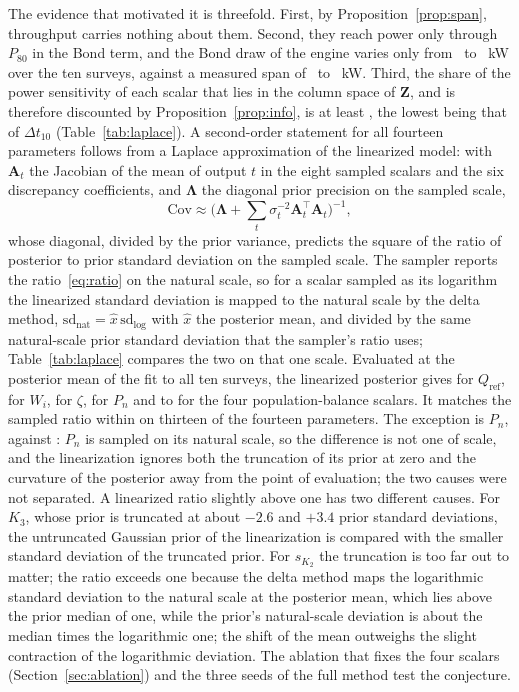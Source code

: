 \documentclass[journal]{IEEEtran}
\begin{document}
The evidence that motivated it is threefold. First, by Proposition~\ref{prop:span}, throughput carries nothing about
them. Second, they reach power only through $P_{80}$ in the Bond term, and the Bond draw of the engine varies only from
\bondKwMin\ to \bondKwMax~kW over the ten surveys, against a measured span of \kwMMin\ to \kwMMax~kW. Third, the share of
the power sensitivity of each scalar that lies in the column space of $\mathbf Z$, and is therefore discounted by
Proposition~\ref{prop:info}, is at least \thSpanMin{}, the lowest being that of $\Delta t_{10}$ (Table~\ref{tab:laplace}). A
second-order statement for all fourteen parameters follows from a Laplace approximation of the linearized model: with
$\mathbf A_t$ the Jacobian of the mean of output $t$ in the eight sampled scalars and the six discrepancy coefficients, and
$\boldsymbol\Lambda$ the diagonal prior precision on the sampled scale,
\begin{equation}
\mathrm{Cov}\approx\Big(\boldsymbol\Lambda+\sum_t\sigma_t^{-2}\mathbf A_t^{\top}\mathbf A_t\Big)^{-1},
\label{eq:laplace}
\end{equation}
whose diagonal, divided by the prior variance, predicts the square of the ratio of posterior to prior standard deviation
on the sampled scale. The sampler reports the ratio~\eqref{eq:ratio} on the natural scale, so for a scalar sampled as its
logarithm the linearized standard deviation is mapped to the natural scale by the delta method,
$\mathrm{sd}_{\mathrm{nat}}=\hat x\,\mathrm{sd}_{\log}$ with $\hat x$ the posterior mean, and divided by the same
natural-scale prior standard deviation that the sampler's ratio uses; Table~\ref{tab:laplace} compares the two on that one
scale. Evaluated at the posterior mean of the fit to all ten surveys, the linearized posterior gives \thLapQRef{} for
$Q_{\mathrm{ref}}$, \thLapWi{} for $W_i$, \thLapZeta{} for $\zeta$, \thLapPn{} for $P_n$ and \thLapPbMin{} to
\thLapPbMax{} for the four population-balance scalars. It matches the sampled ratio within \thLapMaxDevRest{} on thirteen
of the fourteen parameters. The exception is $P_n$, \thLapPn{} against \pnContr: $P_n$ is sampled on its natural scale, so
the difference is not one of scale, and the linearization ignores both the truncation of its prior at zero and the
curvature of the posterior away from the point of evaluation; the two causes were not separated. A linearized ratio
slightly above one has two different causes. For $K_3$, whose prior is truncated at about $-2.6$ and $+3.4$ prior standard
deviations, the untruncated Gaussian prior of the linearization is compared with the smaller standard deviation of the
truncated prior. For $s_{K_2}$ the truncation is too far out to matter; the ratio exceeds one because the delta method maps
the logarithmic standard deviation to the natural scale at the posterior mean, which lies above the prior median of one,
while the prior's natural-scale deviation is about the median times the logarithmic one; the shift of the mean outweighs the
slight contraction of the logarithmic deviation. The ablation that fixes the four scalars
(Section~\ref{sec:ablation}) and the three seeds of the full method test the conjecture.
\end{document}
